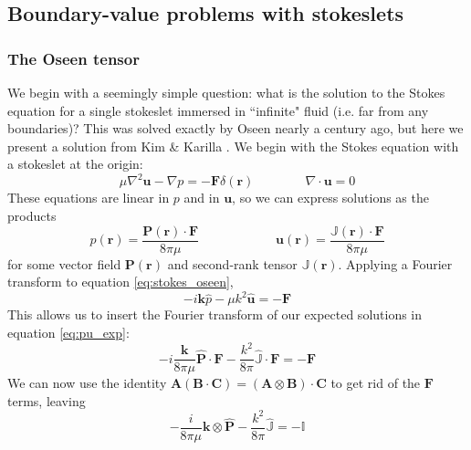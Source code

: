 \documentclass[11pt]{ucthesis}
\begin{document}
\subsection{Boundary-value problems with stokeslets}

\subsubsection{The Oseen tensor}
\label{sec:oseentensor}

We begin with a seemingly simple question: what is the solution to the Stokes equation for a single stokeslet immersed in ``infinite" fluid (i.e. far from any boundaries)? This was solved exactly by Oseen nearly a century ago, but here we present a solution from Kim \& Karilla \cite{kim2013microhydrodynamics,lisicki2013four}. We begin with the Stokes equation with a stokeslet at the origin:
\begin{equation}
\label{eq:stokes_oseen}
\mu\nabla^2\mathbf{u} - \nabla p = -\mathbf{F}\delta(\mathbf{r})\qquad\qquad\nabla\cdot\mathbf{u} = 0
\end{equation} 
These equations are linear in $p$ and in $\mathbf{u}$, so we can express solutions as the products
\begin{equation}
\label{eq:pu_exp}
p(\mathbf{r}) = \frac{\mathbf{P(r)}\cdot\mathbf{F}}{8\pi\mu} \qquad\qquad\qquad \mathbf{u(r)} = \frac{\mathbb{J}(\mathbf{r})\cdot\mathbf{F}}{8\pi \mu}
\end{equation}
for some vector field $\mathbf{P(r)}$ and second-rank tensor $\mathbb{J}(\mathbf{r})$. Applying a Fourier transform to equation \ref{eq:stokes_oseen},
\begin{equation}
\label{eq:stokes_ft}
-i\mathbf{k}\hat{p} -\mu k^2\hat{\mathbf{u}} = -\mathbf{F}
\end{equation}
This allows us to insert the Fourier transform of our expected solutions in equation \ref{eq:pu_exp}:
\begin{equation}
-i\frac{\mathbf{k}}{8\pi\mu}\hat{\mathbf{P}}\cdot\mathbf{F} - \frac{k^2}{8\pi}\hat{\mathbb{J}}\cdot\mathbf{F} = -\mathbf{F}
\end{equation}
We can now use the identity $\mathbf{A}(\mathbf{B}\cdot\mathbf{C}) = (\mathbf{A}\otimes\mathbf{B})\cdot\mathbf{C}$ to get rid of the $\mathbf{F}$ terms, leaving 
\begin{equation}
\label{eq:stokes_ft_exp}
-\frac{i}{8\pi\mu}\mathbf{k}\otimes\hat{\mathbf{P}} - \frac{k^2}{8\pi}\hat{\mathbb{J}} = -\mathbb{I}
\end{equation}
\end{document}
